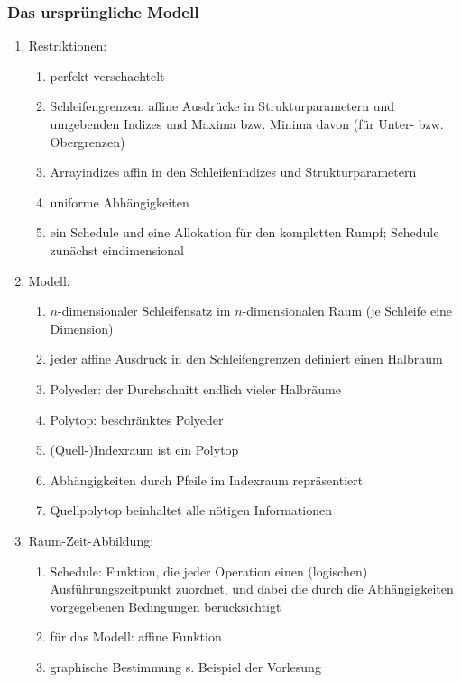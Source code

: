 \subsubsection{Das ursprüngliche Modell}
\label{sec:orig-mod}

\begin{enumerate}
\item Restriktionen:
\begin{enumerate}
\item perfekt verschachtelt
\item Schleifengrenzen: affine Ausdrücke in Strukturparametern und umgebenden
  Indizes und Maxima bzw. Minima davon (für Unter- bzw. Obergrenzen)
\item Arrayindizes affin in den Schleifenindizes und Strukturparametern
\item uniforme Abhängigkeiten
\item ein Schedule und eine Allokation für den kompletten Rumpf;
  Schedule zunächst eindimensional
\end{enumerate}
%
\item Modell:
\begin{enumerate}
\item $n$-dimensionaler Schleifensatz im $n$-dimensionalen Raum (je
  Schleife eine Dimension)
\item jeder affine Ausdruck in den Schleifengrenzen definiert einen
  Halbraum
\item Polyeder: der Durchschnitt endlich vieler Halbräume
\item Polytop: beschränktes Polyeder
\item (Quell-)Indexraum ist ein Polytop
\item Abhängigkeiten durch Pfeile im Indexraum repräsentiert
\item Quellpolytop beinhaltet alle nötigen Informationen
\end{enumerate}
%
\item Raum-Zeit-Abbildung:
\begin{enumerate}
\item Schedule: Funktion, die jeder Operation einen (logischen)
  Ausführungszeitpunkt zuordnet, und dabei die durch die Abhängigkeiten
  vorgegebenen Bedingungen berücksichtigt
\item für das Modell: affine Funktion
\item graphische Bestimmung s. Beispiel der Vorlesung

\end{enumerate}
\end{enumerate}
